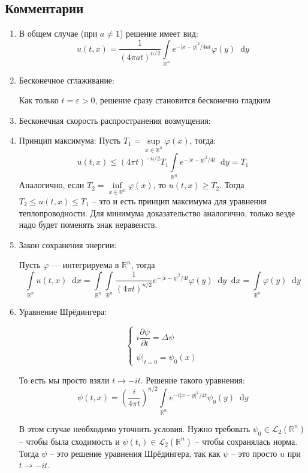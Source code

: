 \documentclass[11pt,a4paper]{report}
\numberwithin{equation}{section}
\numberwithin{figure}{chapter}
\numberwithin{table}{chapter}
\newcommand{\R}{\mathbb{R}}
\renewcommand{\L}{\mathcal{L}}
\newcommand{\p}{\partial}
\newcommand{\dd}{\mathop{}\!\mathrm{d}}
\newcommand{\skobka}[1]{\left( #1 \right)}
\renewcommand{\phi}{\varphi}
\renewcommand{\epsilon}{\varepsilon}
\begin{document}
\subsection{Комментарии}
\begin{enumerate}
    \item В общем случае (при $a\neq 1$) решение имеет вид:
    \[
    u(t,x) = \dfrac{1}{(4\pi at)^{n/2}}\int\limits_{\R^n}e^{-|x-y|^2/4at}\phi(y)\dd y
    \]


    \item Бесконечное сглаживание:

    Как только $t = \epsilon>0$, решение сразу становится бесконечно гладким

    \item Бесконечная скорость распространения возмущения:

    \item Принцип максимума:
    Пусть $T_1 = \sup\limits_{x\in\R^n}\phi(x)$, тогда:
    \[u(t,x)\leq (4\pi t)^{-n/2}T_1\int\limits_{\R^n}e^{-|x-y|^2/4t}\dd y = T_1\]
    Аналогично, если $T_2 = \inf\limits_{x\in\R^n}\phi(x)$, то $u(t,x)\geq T_2$. Тогда $T_2\leq u(t,x)\leq T_1$ -- это и есть принцип максимума для уравнения теплопроводности.
    Для минимума доказательство аналогично, только везде надо будет поменять знак неравенств.

    \item Закон сохранения энергии:
    
    Пусть $\phi$ --- интегрируема в $\R^n$, тогда
    \[
    \int\limits_{\R^n}u(t,x)\dd x = \int\limits_{\R^n}\int\limits_{\R^n}\dfrac{1}{(4\pi t)^{n/2}}e^{-|x-y|^2/4t}\phi(y)\dd y\dd x = \int\limits_{\R^n}\phi(y)\dd y
    \]




    \item Уравнение Шрёдингера:


    \[
    \begin{cases}
        i\dfrac{\p \psi}{\p t} = \Delta\psi\\
        \\
        \psi\Big|_{t=0} = \psi_0(x)
    \end{cases}
    \]

    То есть мы просто взяли $t \to -it$. Решение такого уравнения:
    \[
    \psi(t,x) = \skobka{\dfrac{i}{4\pi t}}^{n/2}\int\limits_{\R^n}e^{-i|x-y|^2/4t}\psi_0(y)\dd y
    \]

    В этом случае необходимо уточнить условия. Нужно требовать $\psi_0\in\L_2(\R^n)$ -- чтобы была сходимость и $\psi(t_i)\in\L_2(\R^n)$ -- чтобы сохранялась норма. Тогда $\psi$ -- это решение уравнения Шрёдингера, так как $\psi$ -- это просто $u$ при $t \to -it$. 
\end{enumerate}
\end{document}
